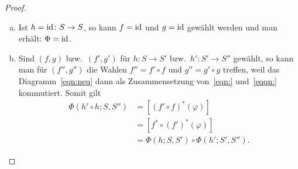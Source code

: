 \begin{proof}
  \begin{enumerate}[(a)]
    \item
      Ist $h = \operatorname{id}\colon S \to S$, so kann $f = \operatorname{id}$ und $g = \operatorname{id}$ gewählt werden und man erhält: $\Phi = \operatorname{id}$.
    \item
      Sind $(f,g)$ bzw.\ $(f',g')$ für $h \colon S \to S'$ bzw.\ $h'\colon S' \to S''$ gewählt, so kann man für $(f'',g'')$ die Wahlen $f'' = f' \circ f$ und $g'' = g' \circ g$ treffen, weil das Diagramm~\eqref{eqn:neu} dann als Zusammensetzung von~\eqref{eqn:} und~\eqref{eqqn:} kommutiert.
      Somit gilt
      \begin{align*}
        \Phi(h' \circ h; S,S'')
          & = [{(f' \circ f)}^* (\varphi)]\\
          & = [f^* \circ {(f')}^* (\varphi)]\\
          & = \Phi(h;S,S') \circ \Phi(h';S',S'').
      \end{align*}
  \end{enumerate}
\end{proof}

